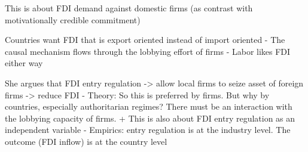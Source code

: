 This is about FDI demand against domestic firms (as contrast with motivationally credible commitment)

Countries want FDI that is export oriented instead of import oriented
- The causal mechanism flows through the lobbying effort of firms
- Labor likes FDI either way

She argues that FDI entry regulation -> allow local firms to seize asset of foreign firms -> reduce FDI
- Theory: So this is preferred by firms. But why by countries, especially authoritarian regimes? There must be an interaction with the lobbying capacity of firms.
	+ This is also about FDI entry regulation as an independent variable
- Empirics: entry regulation is at the industry level. The outcome (FDI inflow) is at the country level